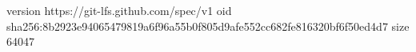 version https://git-lfs.github.com/spec/v1
oid sha256:8b2923e94065479819a6f96a55b0f805d9afe552cc682fe816320bf6f50ed4d7
size 64047
